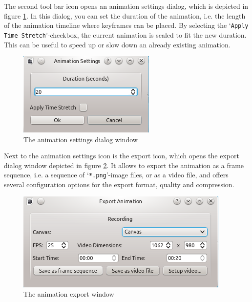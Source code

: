 The second tool bar icon opens an animation settings dialog, which is depicted in figure \ref{fig:animation_settings}. In this dialog, you can set the duration
of the animation, i.e. the length of the animation timeline where keyframes can be placed. By selecting the `\verb|Apply Time Stretch|'-checkbox, the current
animation is scaled to fit the new duration. This can be useful to speed up or slow down an already existing animation.

\begin{figure}[htb]
 \centering
 \includegraphics[scale=0.7,keepaspectratio=true]{./images/animation_settings.png}
 \caption{The animation settings dialog window}
 \label{fig:animation_settings}
\end{figure}

Next to the animation settings icon is the export icon, which opens the export dialog window depicted in figure \ref{fig:animation_export}. 
It allows to export the animation as a frame sequence, i.e. a sequence of `\verb|*.png|'-image files, or as a video file, and offers several configuration
options for the export format, quality and compression.

\begin{figure}[!htb]
 \centering
 \includegraphics[scale=0.7,keepaspectratio=true]{./images/animation_export.png}
 \caption{The animation export window}
 \label{fig:animation_export}
\end{figure}

